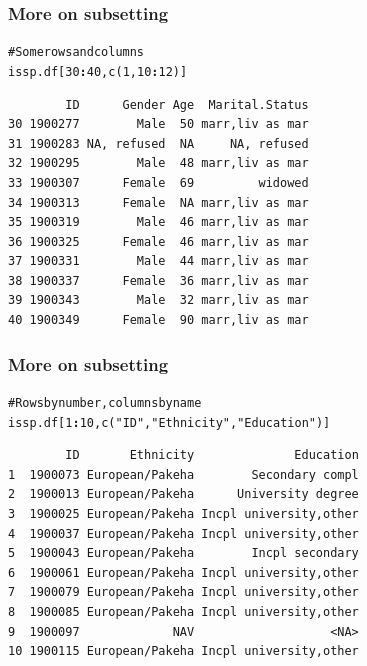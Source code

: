 \documentclass{beamer}\usepackage[]{graphicx}\usepackage[]{color}
\makeatletter
\newcommand{\hlnum}[1]{\textcolor[rgb]{0.533,0,0.133}{#1}}%
\newcommand{\hlstr}[1]{\textcolor[rgb]{0.667,0.267,0}{#1}}%
\newcommand{\hlcom}[1]{\textcolor[rgb]{1,0.533,0}{#1}}%
\newcommand{\hlopt}[1]{\textcolor[rgb]{0,0,0}{\textbf{#1}}}%
\newcommand{\hlstd}[1]{\textcolor[rgb]{0,0,0}{#1}}%
\newcommand{\hlkwd}[1]{\textcolor[rgb]{0,0.267,0.4}{#1}}%
\newenvironment{kframe}{%
 \def\at@end@of@kframe{}%
 \ifinner\ifhmode%
  \def\at@end@of@kframe{\end{minipage}}%
  \begin{minipage}{\columnwidth}%
 \fi\fi%
 \def\FrameCommand##1{\hskip\@totalleftmargin \hskip-\fboxsep
 \colorbox{shadecolor}{##1}\hskip-\fboxsep
     \hskip-\linewidth \hskip-\@totalleftmargin \hskip\columnwidth}%
 \MakeFramed {\advance\hsize-\width
   \@totalleftmargin\z@ \linewidth\hsize
   \@setminipage}}%
 {\par\unskip\endMakeFramed%
 \at@end@of@kframe}
\newenvironment{knitrout}{}{} %
\makeatother
\begin{document}
\begin{frame}[fragile]
\frametitle{More on subsetting}
\begin{knitrout}
\color{fgcolor}\begin{kframe}
\begin{alltt}
\hlcom{#Some rows and columns}
\hlstd{issp.df[}\hlnum{30}\hlopt{:}\hlnum{40}\hlstd{,} \hlkwd{c}\hlstd{(}\hlnum{1}\hlstd{,} \hlnum{10}\hlopt{:}\hlnum{12}\hlstd{)]}
\end{alltt}
\begin{verbatim}
        ID      Gender Age  Marital.Status
30 1900277        Male  50 marr,liv as mar
31 1900283 NA, refused  NA     NA, refused
32 1900295        Male  48 marr,liv as mar
33 1900307      Female  69         widowed
34 1900313      Female  NA marr,liv as mar
35 1900319        Male  46 marr,liv as mar
36 1900325      Female  46 marr,liv as mar
37 1900331        Male  44 marr,liv as mar
38 1900337      Female  36 marr,liv as mar
39 1900343        Male  32 marr,liv as mar
40 1900349      Female  90 marr,liv as mar
\end{verbatim}
\end{kframe}
\end{knitrout}
\end{frame}

\begin{frame}[fragile]
\frametitle{More on subsetting}
\begin{knitrout}
\color{fgcolor}\begin{kframe}
\begin{alltt}
\hlcom{#Rows by number, columns by name}
\hlstd{issp.df[}\hlnum{1}\hlopt{:}\hlnum{10}\hlstd{,} \hlkwd{c}\hlstd{(}\hlstr{"ID"}\hlstd{,} \hlstr{"Ethnicity"}\hlstd{,} \hlstr{"Education"}\hlstd{)]}
\end{alltt}
\begin{verbatim}
        ID       Ethnicity              Education
1  1900073 European/Pakeha        Secondary compl
2  1900013 European/Pakeha      University degree
3  1900025 European/Pakeha Incpl university,other
4  1900037 European/Pakeha Incpl university,other
5  1900043 European/Pakeha        Incpl secondary
6  1900061 European/Pakeha Incpl university,other
7  1900079 European/Pakeha Incpl university,other
8  1900085 European/Pakeha Incpl university,other
9  1900097             NAV                   <NA>
10 1900115 European/Pakeha Incpl university,other
\end{verbatim}
\end{kframe}
\end{knitrout}
\end{frame}
\end{document}
